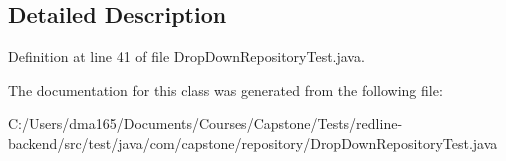 \subsection{Detailed Description}


Definition at line 41 of file Drop\+Down\+Repository\+Test.\+java.



The documentation for this class was generated from the following file\+:\begin{DoxyCompactItemize}
\item 
C\+:/\+Users/dma165/\+Documents/\+Courses/\+Capstone/\+Tests/redline-\/backend/src/test/java/com/capstone/repository/Drop\+Down\+Repository\+Test.\+java\end{DoxyCompactItemize}
